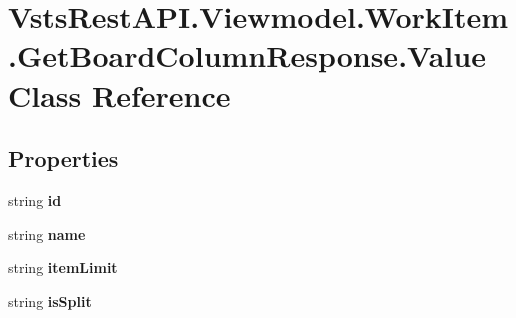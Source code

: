 \hypertarget{class_vsts_rest_a_p_i_1_1_viewmodel_1_1_work_item_1_1_get_board_column_response_1_1_value}{}\section{Vsts\+Rest\+A\+P\+I.\+Viewmodel.\+Work\+Item.\+Get\+Board\+Column\+Response.\+Value Class Reference}
\label{class_vsts_rest_a_p_i_1_1_viewmodel_1_1_work_item_1_1_get_board_column_response_1_1_value}
\subsection*{Properties}
\begin{DoxyCompactItemize}
\item 
\mbox{\label{class_vsts_rest_a_p_i_1_1_viewmodel_1_1_work_item_1_1_get_board_column_response_1_1_value_aa3c70674c1ba00f4d105c9592629cbfb}} 
string {\bfseries id}
\item 
\mbox{\label{class_vsts_rest_a_p_i_1_1_viewmodel_1_1_work_item_1_1_get_board_column_response_1_1_value_a82956117de332238aff0637925947b8d}} 
string {\bfseries name}
\item 
\mbox{\label{class_vsts_rest_a_p_i_1_1_viewmodel_1_1_work_item_1_1_get_board_column_response_1_1_value_a1343a864191dd132e3973c0b32940f11}} 
string {\bfseries item\+Limit}
\item 
\mbox{\label{class_vsts_rest_a_p_i_1_1_viewmodel_1_1_work_item_1_1_get_board_column_response_1_1_value_ab3386898c2a78947b7b7ba99b8dcfc48}} 
string {\bfseries is\+Split}

\end{DoxyCompactItemize}
